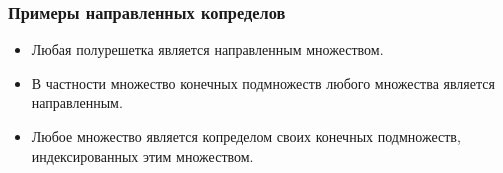 \documentclass{beamer}
\theoremstyle{definition}
\begin{document}
\begin{frame}
\frametitle{Примеры направленных копределов}
\begin{itemize}
\item Любая полурешетка является направленным множеством.
\item В частности множество конечных подмножеств любого множества является направленным.
\item Любое множество является копределом своих конечных подмножеств, индексированных этим множеством.
\end{itemize}
\end{frame}
\end{document}
